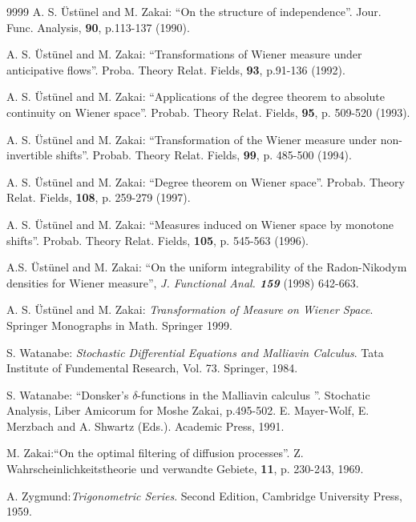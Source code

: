 \documentclass[12pt,a4paper]{book}
\begin{document}
\begin{thebibliography}{9999}
A. S. \"Ust\"unel and M. Zakai: ``On the structure of
independence''. Jour. Func. Analysis, {\bf 90}, p.113-137 (1990).


A. S. \"Ust\"unel and M. Zakai: ``Transformations  of Wiener
measure under anticipative flows''.
Proba. Theory Relat. Fields, {\bf 93}, p.91-136 (1992).

A. S. \"Ust\"unel and M. Zakai: ``Applications of the degree
theorem to absolute continuity on Wiener space''.
Probab. Theory Relat. Fields, {\bf 95}, p. 509-520 (1993).

A. S. \"Ust\"unel and M. Zakai: ``Transformation of the Wiener
measure under non-invertible shifts''. Probab. Theory Relat. Fields,
{\bf 99}, p. 485-500 (1994).

A. S. \"Ust\"unel and M. Zakai: ``Degree theorem on
  Wiener space''.  Probab. Theory Relat. Fields,
{\bf 108}, p. 259-279 (1997).

A. S. \"Ust\"unel and M. Zakai: ``Measures induced on
  Wiener space by monotone shifts''.  Probab. Theory Relat. Fields,
{\bf 105}, p. 545-563 (1996).

A.S. \"Ust\"unel and M. Zakai:
``On the uniform integrability of the Radon-Nikodym densities for
Wiener measure'', {\sl J. Functional Anal. {\bf 159}} (1998) 642-663.


A. S. \"Ust\"unel and M. Zakai: {\sl  Transformation of Measure
  on Wiener Space}. Springer  Monographs in Math. Springer 1999.


S. Watanabe: {\sl  Stochastic Differential Equations and Malliavin
Calculus}. Tata Institute of Fundemental Research, Vol. 73. Springer, 1984.

S. Watanabe: ``Donsker's $\delta$-functions in the Malliavin
calculus ''. Stochatic Analysis, Liber Amicorum for Moshe Zakai, p.495-502.
E. Mayer-Wolf, E. Merzbach and A. Shwartz (Eds.). Academic Press, 1991.

M. Zakai:``On the optimal filtering of diffusion
  processes''. Z. Wahrscheinlichkeitstheorie und verwandte Gebiete,
 {\bf  11}, p. 230-243, 1969.

A. Zygmund:{\sl  Trigonometric Series}. Second Edition, Cambridge
University Press, 1959.

\end{thebibliography}

\printindex[sub]
\printindex[not]
\end{document}

